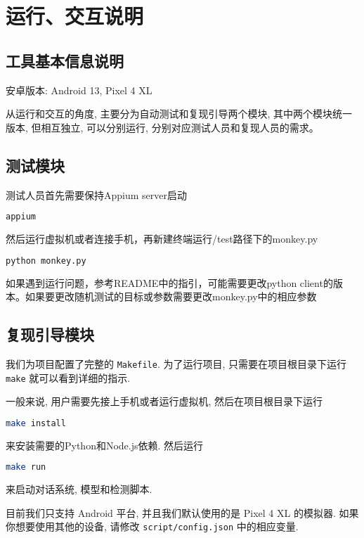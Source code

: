 \section{运行、交互说明}

\subsection{工具基本信息说明}
\noindent 安卓版本: Android 13, Pixel 4 XL

\noindent 从运行和交互的角度, 主要分为自动测试和复现引导两个模块, 其中两个模块统一版本, 但相互独立, 可以分别运行, 分别对应测试人员和复现人员的需求。

\subsection{测试模块}
\noindent 测试人员首先需要保持Appium server启动
\begin{lstlisting}[language=sh, showtabs=true]
    appium
\end{lstlisting}
然后运行虚拟机或者连接手机，再新建终端运行/test路径下的monkey.py
\begin{lstlisting}[language=sh, showtabs=true]
    python monkey.py
\end{lstlisting}
如果遇到运行问题，参考README中的指引，可能需要更改python client的版本。如果要更改随机测试的目标或参数需要更改monkey.py中的相应参数

\subsection{复现引导模块}

我们为项目配置了完整的 \lstinline{Makefile}. 为了运行项目, 只需要在项目根目录下运行 \lstinline{make} 就可以看到详细的指示.

\scalebox{0.9}{
    
}

\noindent 一般来说, 用户需要先接上手机或者运行虚拟机, 然后在项目根目录下运行

\begin{lstlisting}[language=sh]
    make install
\end{lstlisting}
来安装需要的Python和Node.js依赖. 然后运行
\begin{lstlisting}[language=sh, showtabs=true]
    make run
\end{lstlisting}
来启动对话系统, 模型和检测脚本. 

\scalebox{0.9}{

}


\noindent 目前我们只支持 Android 平台, 并且我们默认使用的是 Pixel 4 XL 的模拟器. 如果你想要使用其他的设备, 请修改 \lstinline{script/config.json} 中的相应变量.


